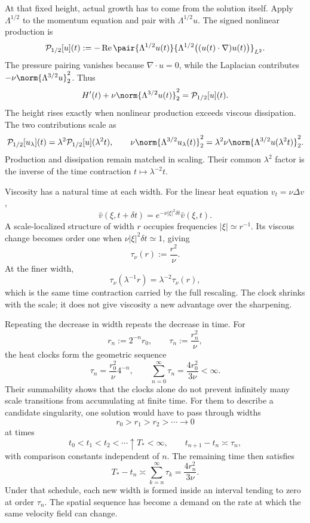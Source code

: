 At that fixed height, actual growth has to come from the solution itself.
Apply \(\Lambda^{1/2}\) to the momentum equation and pair with \(\Lambda^{1/2}u\).
The signed nonlinear production is
\[
  \mathcal P_{1/2}[u](t)
  :=
  -\operatorname{Re}
  \pair
    {\Lambda^{1/2}u(t)}
    {\Lambda^{1/2}\bigl((u(t)\cdot\nabla)u(t)\bigr)}_{L^2}.
\]
The pressure pairing vanishes because \(\nabla\cdot u=0\), while the Laplacian contributes \(-\nu\norm{\Lambda^{3/2}u}_2^2\).
Thus
\[
  H'(t)
  +
  \nu\norm{\Lambda^{3/2}u(t)}_2^2
  =
  \mathcal P_{1/2}[u](t).
\]
The height rises exactly when nonlinear production exceeds viscous dissipation.
The two contributions scale as
\[
  \mathcal P_{1/2}[u_\lambda](t)
  =
  \lambda^2\mathcal P_{1/2}[u](\lambda^2t),
  \qquad
  \nu\norm{\Lambda^{3/2}u_\lambda(t)}_2^2
  =
  \lambda^2\nu\norm{\Lambda^{3/2}u(\lambda^2t)}_2^2.
\]
Production and dissipation remain matched in scaling.
Their common \(\lambda^2\) factor is the inverse of the time contraction \(t\mapsto\lambda^{-2}t\).


Viscosity has a natural time at each width.
For the linear heat equation \(v_t=\nu\Delta v\),
\[
  \widehat v(\xi,t+\delta t)
  =
  e^{-\nu|\xi|^2\delta t}\widehat v(\xi,t).
\]
A scale-localized structure of width \(r\) occupies frequencies \(|\xi|\simeq r^{-1}\).
Its viscous change becomes order one when \(\nu|\xi|^2\delta t\simeq1\), giving
\[
  \tau_\nu(r)
  :=
  \frac{r^2}{\nu}.
\]
At the finer width,
\[
  \tau_\nu(\lambda^{-1}r)
  =
  \lambda^{-2}\tau_\nu(r),
\]
which is the same time contraction carried by the full \NavierStokes{} rescaling.
The clock shrinks with the scale; it does not give viscosity a new advantage over the sharpening.


Repeating the decrease in width repeats the decrease in time.
For
\[
  r_n:=2^{-n}r_0,
  \qquad
  \tau_n:=\frac{r_n^2}{\nu},
\]
the heat clocks form the geometric sequence
\[
  \tau_n
  =
  \frac{r_0^2}{\nu}4^{-n},
  \qquad
  \sum_{n=0}^{\infty}\tau_n
  =
  \frac{4r_0^2}{3\nu}
  <
  \infty.
\]
Their summability shows that the clocks alone do not prevent infinitely many scale transitions from accumulating at finite time.
For them to describe a candidate singularity, one \NavierStokes{} solution would have to pass through widths
\[
  r_0>r_1>r_2>\cdots\longrightarrow0
\]
at times
\[
  t_0<t_1<t_2<\cdots\uparrow T_*<\infty,
  \qquad
  t_{n+1}-t_n\asymp\tau_n,
\]
with comparison constants independent of \(n\).
The remaining time then satisfies
\[
  T_*-t_n
  \asymp
  \sum_{k=n}^{\infty}\tau_k
  =
  \frac{4r_n^2}{3\nu}.
\]
Under that schedule, each new width is formed inside an interval tending to zero at order \(\tau_n\).
The spatial sequence has become a demand on the rate at which the same velocity field can change.
